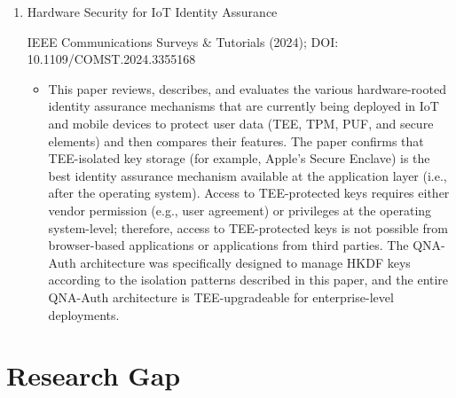 \begin{enumerate}
arXiv references through to 2024–2025; URL: https://arxiv.org/abs/1905.09162

\begin{itemize}
\item This paper demonstrates that adversarial input will result in the gradual biometrical update of the target's biometric template by poisoning unsupervised template update systems. The analysis of this attack is limited to unimodal (single) updates and does not cover multi-modal fusion of gated updates. The QNA-Auth implementation of the EMA-gated re-enrollment policy will only permit updates to templates where the new biometric samples scored above the strong accepted threshold and will block the low-confidence impostor sample from poisoning the template.
\end{itemize}

\item Hardware Security for IoT Identity Assurance

IEEE Communications Surveys \& Tutorials (2024); DOI: 10.1109/COMST.2024.3355168

\begin{itemize}
\item This paper reviews, describes, and evaluates the various hardware-rooted identity assurance mechanisms that are currently being deployed in IoT and mobile devices to protect user data (TEE, TPM, PUF, and secure elements) and then compares their features. The paper confirms that TEE-isolated key storage (for example, Apple's Secure Enclave) is the best identity assurance mechanism available at the application layer (i.e., after the operating system). Access to TEE-protected keys requires either vendor permission (e.g., user agreement) or privileges at the operating system-level; therefore, access to TEE-protected keys is not possible from browser-based applications or applications from third parties. The QNA-Auth architecture was specifically designed to manage HKDF keys according to the isolation patterns described in this paper, and the entire QNA-Auth architecture is TEE-upgradeable for enterprise-level deployments.
\end{itemize}

\end{enumerate}


\section{Research Gap}

